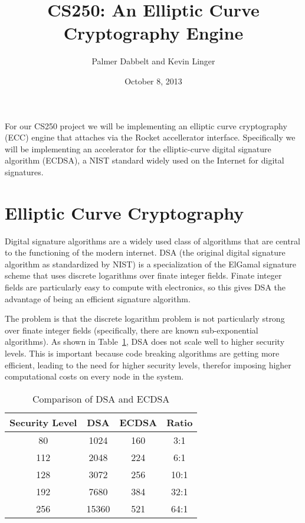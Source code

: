 \documentclass[twocolumn]{article}
\title{CS250: An Elliptic Curve Cryptography Engine}
\author{Palmer Dabbelt and Kevin Linger}
\date{October 8, 2013}
\begin{document}
\maketitle

For our CS250 project we will be implementing an elliptic curve
cryptography (ECC) engine that attaches via the Rocket accellerator
interface.  Specifically we will be implementing an accelerator for
the elliptic-curve digital signature algorithm (ECDSA), a NIST
standard widely used on the Internet for digital signatures.

\section{Elliptic Curve Cryptography}

Digital signature algorithms\cite{fips-186-3} are a widely used class
of algorithms that are central to the functioning of the modern
internet.  DSA\cite{us-dsa} (the original digital signature algorithm
as standardized by NIST) is a specialization of the ElGamal signature
scheme\cite{elgamal-sig} that uses discrete logarithms over finate
integer fields.  Finate integer fields are particularly easy to
compute with electronics, so this gives DSA the advantage of being an
efficient signature algorithm.

The problem is that the discrete logarithm problem is not particularly
strong over finate integer fields (specifically, there are known
sub-exponential algorithms\cite{adleman-subexp}).  As shown in
Table~\ref{key-sizes}, DSA does not scale well to higher security
levels.  This is important because code breaking algorithms are
getting more efficient, leading to the need for higher security
levels, therefor imposing higher computational costs on every node in
the system.

\begin{table}[h]
  \begin{center}
    \begin{tabular}{cccc}
      Security Level & DSA & ECDSA & Ratio \\
      \hline
      80 & 1024 & 160 & 3:1 \\
      112 & 2048 & 224 & 6:1 \\
      128 & 3072 & 256 & 10:1 \\
      192 & 7680 & 384 & 32:1 \\
      256 & 15360 & 521 & 64:1 \\
    \end{tabular}
  \end{center}

  \caption{Comparison of DSA and ECDSA\cite{nsa-case_for_ecc}
    \label{key-sizes}}
\end{table}
\end{document}
